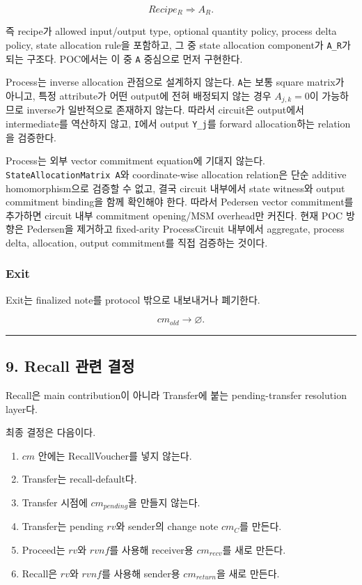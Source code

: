 \documentclass[11pt]{extarticle}
\begin{document}
\[
Recipe_R\Longrightarrow A_R.
\]

즉 recipe가 allowed input/output type, optional quantity policy, process
delta policy, state allocation rule을 포함하고, 그 중 state allocation
component가 \texttt{A\_R}가 되는 구조다. POC에서는 이 중 \texttt{A}
중심으로 먼저 구현한다.

Process는 inverse allocation 관점으로 설계하지 않는다. \texttt{A}는 보통
square matrix가 아니고, 특정 attribute가 어떤 output에 전혀 배정되지
않는 경우 $A_{j,k}=0$이 가능하므로 inverse가
일반적으로 존재하지 않는다. 따라서 circuit은 output에서 intermediate를
역산하지 않고, \texttt{I}에서 output \texttt{Y\_j}를 forward
allocation하는 relation을 검증한다.

Process는 외부 vector commitment equation에 기대지 않는다.
\texttt{StateAllocationMatrix\ A}와 coordinate-wise allocation
relation은 단순 additive homomorphism으로 검증할 수 없고, 결국 circuit
내부에서 state witness와 output commitment binding을 함께 확인해야 한다.
따라서 Pedersen vector commitment를 추가하면 circuit 내부 commitment
opening/MSM overhead만 커진다. 현재 POC 방향은 Pedersen을 제거하고
fixed-arity ProcessCircuit 내부에서 aggregate, process delta,
allocation, output commitment를 직접 검증하는 것이다.

\subsubsection{Exit}\label{exit}

Exit는 finalized note를 protocol 밖으로 내보내거나 폐기한다.

\[
cm_{old}\longrightarrow\varnothing.
\]

\begin{center}\rule{0.5\linewidth}{0.5pt}\end{center}

\subsection{9. Recall 관련
결정}\label{9-recall-uxad00uxb828-uxacb0uxc815}

Recall은 main contribution이 아니라 Transfer에 붙는 pending-transfer
resolution layer다.

최종 결정은 다음이다.

\begin{enumerate}
  \item $cm$ 안에는 RecallVoucher를 넣지 않는다.
  \item Transfer는 recall-default다.
  \item Transfer 시점에 $cm_{pending}$을 만들지 않는다.
  \item Transfer는 pending $rv$와 sender의 change note $cm_C$를 만든다.
  \item Proceed는 $rv$와 $rvnf$를 사용해 receiver용 $cm_{recv}$를 새로 만든다.
  \item Recall은 $rv$와 $rvnf$를 사용해 sender용 $cm_{return}$을 새로 만든다.
\end{enumerate}
\end{document}
